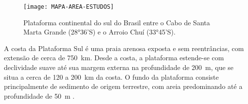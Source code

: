 \documentclass[a4paper,11pt,twoside,showtrims,onecolumn,openright,final]{memoir}
\begin{document}
%

\begin{figure}
\begin{center}
\texttt{[image: MAPA-AREA-ESTUDOS]}
\end{center}
\caption[Plataforma continental do sul do Brasil entre o 
         Cabo de Santa Marta Grande (28°36'S) 
         e o Arroio Chuí (33°45'S)]
	{Plataforma continental do sul do Brasil entre o 
         Cabo de Santa Marta Grande (28°36'S) 
         e o Arroio Chuí (33°45'S).}
\label{fig:mapa-area-plataforma-sul}
\end{figure}



A costa da Plataforma Sul é uma praia arenosa exposta e sem reentrâncias, 
com extensão de cerca de 750~km. Desde a costa, a plataforma estende-se com declividade 
suave até sua margem externa na profundidade de 200~m, que se situa a cerca 
de 120 a 200~km da costa. O fundo da plataforma consiste principalmente de sedimento 
de origem terrestre, com areia predominando até 
a profundidade de 50~m \citep{correa1977,calliari1997}. %
\end{document}
